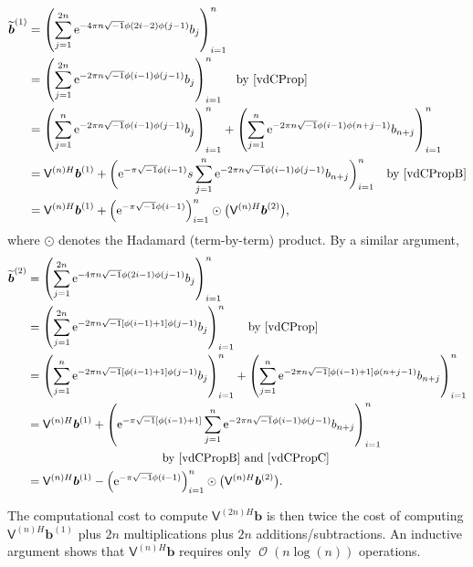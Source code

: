 \documentclass{iitthesis}          %
\DeclareMathOperator{\Order}{{\mathcal O}}
\newcommand{\bm}[1]{\boldsymbol{#1}}
\newcommand{\vb}{\bm{b}}
\newcommand{\mV}{\mathsf{V}}
\newcommand{\me}{\mathrm{e}}
\begin{document}
\begin{align*}
\widetilde{\vb}^{(1)} &= \left( \sum_{j=1}^{2n}  \me^{-4 \pi n \sqrt{-1} \phi(2i-2)\phi(j-1)} b_{j} \right)_{i=1}^n \\
&= \left( \sum_{j=1}^{2n}  \me^{-2 \pi n \sqrt{-1} \phi(i-1)\phi(j-1)} b_{j} \right)_{i=1}^n \quad \text{by \eqref{vdCProp}}\\
&= \left( \sum_{j=1}^{n}  \me^{-2 \pi n \sqrt{-1} \phi(i-1)\phi(j-1)} b_{j} \right)_{i=1}^n  +  \left( \sum_{j=1}^{n}  \me^{-2 \pi n \sqrt{-1} \phi(i-1)\phi(n+j-1)} b_{n+j} \right)_{i=1}^n \\
&= \mV^{(n)H}\vb^{(1)}  +  \biggl(  \me^{-\pi \sqrt{-1} \phi(i-1)}  s \sum_{j=1}^{n}  \me^{-2 \pi n \sqrt{-1} \phi(i-1)\phi(j-1)} b_{n+j} \biggr)_{i=1}^n \quad  \text{by \eqref{vdCPropB}}\\
&= \mV^{(n)H}\vb^{(1)} +  \left(  \me^{-\pi \sqrt{-1} \phi(i-1)} \right)_{i=1}^n \odot \bigl(\mV^{(n)H}\vb^{(2)} \bigr),
\end{align*}
where $\odot$ denotes the Hadamard (term-by-term) product.  By a similar argument, 
\begin{align*}
\widetilde{\vb}^{(2)} &= \left( \sum_{j=1}^{2n}  \me^{-4 \pi n \sqrt{-1} \phi(2i-1)\phi(j-1)} b_{j} \right)_{i=1}^n \\
&= \left( \sum_{j=1}^{2n}  \me^{-2 \pi n \sqrt{-1} [\phi(i-1)+1]\phi(j-1)} b_{j} \right)_{i=1}^n \quad \text{by \eqref{vdCProp}}\\
&= \left( \sum_{j=1}^{n}  \me^{-2 \pi n \sqrt{-1} [\phi(i-1)+1]\phi(j-1)} b_{j} \right)_{i=1}^n 
 +  \left( \sum_{j=1}^{n}  \me^{-2 \pi n \sqrt{-1} [\phi(i-1)+1]\phi(n+j-1)} b_{n+j} \right)_{i=1}^n \\
&= \mV^{(n)H}\vb^{(1)} 
+  \left(  \me^{ -\pi \sqrt{-1} [\phi(i-1) + 1]}  \sum_{j=1}^{n}  \me^{-2 \pi n \sqrt{-1} \phi(i-1)\phi(j-1)} b_{n+j} \right)_{i=1}^n \\
& \hspace{4cm}  \text{by \eqref{vdCPropB} and \eqref{vdCPropC}}\\
&= \mV^{(n)H}\vb^{(1)} -  \left(  \me^{-\pi \sqrt{-1} \phi(i-1)} \right)_{i=1}^n \odot \bigl(\mV^{(n)H}\vb^{(2)} \bigr).
\end{align*}

The computational cost to compute $\mV^{(2n)H}\vb$ is then twice the cost of computing $\mV^{(n)H}\vb^{(1)}$ plus $2n$ multiplications plus $2n$ additions/subtractions.  An inductive argument shows that $\mV^{(n)H}\vb$ requires only $\Order(n \log(n))$ operations.
\end{document}
